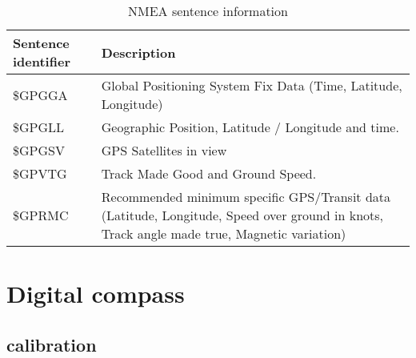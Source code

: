 \begin{table}[!h]
    \centering
    \caption{NMEA sentence information}
    \label{table:NMEA}
    \begin{tabular}{ | m{10em} | m{25em} | }
        
        \hline
        \textbf{Sentence identifier} & \textbf{Description} \\
        \hline
        \$GPGGA & Global Positioning System Fix Data (Time, Latitude, Longitude) \\
        \hline
        \$GPGLL & Geographic Position, Latitude / Longitude and time. \\
        \hline
        \$GPGSV & GPS Satellites in view \\
        \hline
        \$GPVTG & Track Made Good and Ground Speed. \\
        \hline
        \$GPRMC & Recommended minimum specific GPS/Transit data (Latitude, Longitude, Speed over ground in knots, Track angle made true, Magnetic variation) \\
        \hline
    \end{tabular}
\end{table}



\section{Digital compass}

\subsection{calibration}



